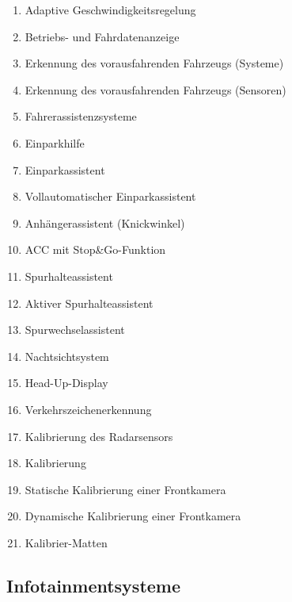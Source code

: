\begin{enumerate}
\item
  Adaptive Geschwindigkeitsregelung\\
\item
  Betriebs- und Fahrdatenanzeige\\
\item
  Erkennung des vorausfahrenden Fahrzeugs (Systeme)\\
\item
  Erkennung des vorausfahrenden Fahrzeugs (Sensoren)\\
\item
  Fahrerassistenzsysteme\\
\item
  Einparkhilfe\\
\item
  Einparkassistent\\
\item
  Vollautomatischer Einparkassistent\\
\item
  Anhängerassistent (Knickwinkel)\\
\item
  ACC mit Stop\&Go-Funktion\\
\item
  Spurhalteassistent\\
\item
  Aktiver Spurhalteassistent\\
\item
  Spurwechselassistent\\
\item
  Nachtsichtsystem\\
\item
  Head-Up-Display\\
\item
  Verkehrszeichenerkennung\\
\item
  Kalibrierung des Radarsensors\\
\item
  Kalibrierung\\
\item
  Statische Kalibrierung einer Frontkamera\\
\item
  Dynamische Kalibrierung einer Frontkamera\\
\item
  Kalibrier-Matten
\end{enumerate}

\subsection{Infotainmentsysteme}\label{infotainmentsysteme}

